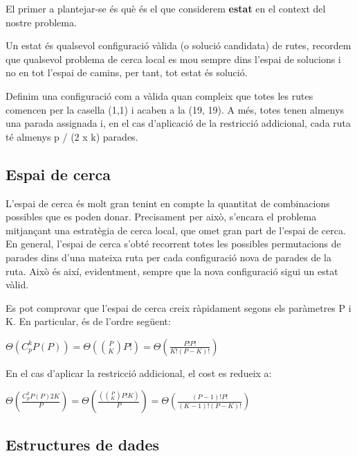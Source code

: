 
El primer a plantejar-se és què és el que considerem \textbf{estat} en el context del nostre problema. 

Un estat és qualsevol configuració vàlida (o solució candidata) de rutes, recordem que qualsevol problema de cerca local es mou sempre dins l'espai de solucions i no en tot l'espai de camins, per tant, tot estat és solució. 

Definim una configuració com a vàlida quan compleix que totes les rutes comencen per la casella (1,1) i acaben a la (19, 19). A més, totes tenen almenys una parada assignada i, en el cas d'aplicació de la restricció addicional, cada ruta té almenys p / (2 x k) parades.

\subsection{Espai de cerca} %
\label{sec:espaicerca}

L'espai de cerca és molt gran tenint en compte la quantitat de combinacions possibles que es poden donar. Precisament per això, s'encara el problema mitjançant una estratègia de cerca local, que omet gran part de l'espai de cerca. En general, l'espai de cerca s'obté recorrent totes les possibles permutacions de parades dins d'una mateixa ruta per cada configuració nova de parades de la ruta. Això és així, evidentment, sempre que la nova configuració sigui un estat vàlid. 

Es pot comprovar que l'espai de cerca creix ràpidament segons els paràmetres P i K. En particular, és de l'ordre següent:

\begin{center}
\Large{$\Theta(C_{p}^{k} P(P)) = \Theta({P \choose K} P!) = \Theta(\frac{P!P!}{K!(P-K)!}) $}
\end{center}


En el cas d'aplicar la restricció addicional, el cost es redueix a:

\begin{center}
\Large{$\Theta(\frac{C_{p}^{k} P(P) 2K}{P}) = \Theta(\frac{({P \choose K} P!K)}{P}) = \Theta(\frac{(P-1)!P!}{(K-1)!(P-K)!})$ }
\end{center}

\subsection{Estructures de dades}	%

